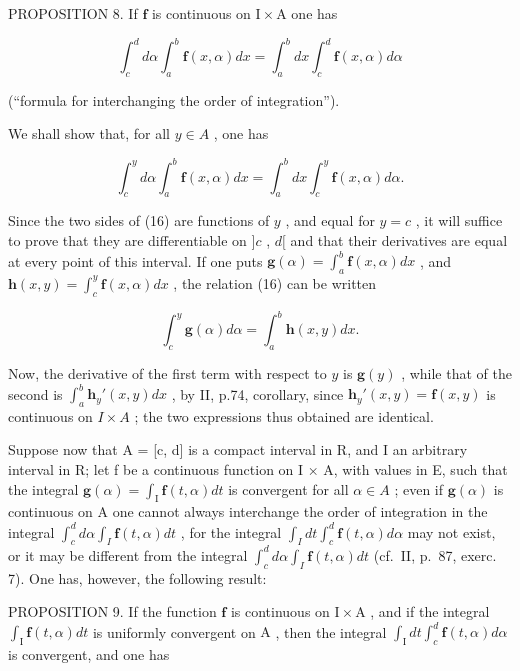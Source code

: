PROPOSITION 8. If \(\mathbf{f}\) is continuous on \(\mathrm{I} \times \mathrm{A}\) one has

\[
\int_ {c} ^ {d} d \alpha \int_ {a} ^ {b} \mathbf {f} (x, \alpha) d x = \int_ {a} ^ {b} d x \int_ {c} ^ {d} \mathbf {f} (x, \alpha) d \alpha\tag{15}
\]

(``formula for interchanging the order of integration'').

We shall show that, for all \(y \in A\) , one has

\[
\int_ {c} ^ {y} d \alpha \int_ {a} ^ {b} \mathbf {f} (x, \alpha) d x = \int_ {a} ^ {b} d x \int_ {c} ^ {y} \mathbf {f} (x, \alpha) d \alpha .\tag{16}
\]

Since the two sides of (16) are functions of \(y\) , and equal for \(y = c\) , it will suffice to prove that they are differentiable on \(]c\) , \(d[\) and that their derivatives are equal at every point of this interval. If one puts \(\mathbf{g}(\alpha) = \int_{a}^{b} \mathbf{f}(x, \alpha) dx\) , and \(\mathbf{h}(x, y) = \int_{c}^{y} \mathbf{f}(x, \alpha) dx\) , the relation (16) can be written

\[
\int_ {c} ^ {y} \mathbf {g} (\alpha) d \alpha = \int_ {a} ^ {b} \mathbf {h} (x, y) d x.
\]

Now, the derivative of the first term with respect to \(y\) is \(\mathbf{g}(y)\) , while that of the second is \(\int_{a}^{b} \mathbf{h}_{y}'(x, y) dx\) , by II, p.74, corollary, since \(\mathbf{h}_{y}'(x, y) = \mathbf{f}(x, y)\) is continuous on \(I \times A\) ; the two expressions thus obtained are identical.

Suppose now that A = {[}c, d{]} is a compact interval in R, and I an arbitrary interval in R; let f be a continuous function on I × A, with values in E, such that the integral \(\mathbf{g}(\alpha) = \int_{\mathrm{I}} \mathbf{f}(t, \alpha) dt\) is convergent for all \(\alpha \in A\) ; even if \(\mathbf{g}(\alpha)\) is continuous on A one cannot always interchange the order of integration in the integral \(\int_{c}^{d} d\alpha \int_{I} \mathbf{f}(t, \alpha) dt\) , for the integral \(\int_{I} dt \int_{c}^{d} \mathbf{f}(t, \alpha) d\alpha\) may not exist, or it may be different from the integral \(\int_{c}^{d} d\alpha \int_{I} \mathbf{f}(t, \alpha) dt\) (cf.~II, p.~87, exerc. 7). One has, however, the following result:

PROPOSITION 9. If the function \(\mathbf{f}\) is continuous on \(\mathrm{I} \times \mathrm{A}\) , and if the integral \(\int_{\mathrm{I}} \mathbf{f}(t, \alpha) dt\) is uniformly convergent on \(\mathrm{A}\) , then the integral \(\int_{\mathrm{I}} dt \int_{c}^{d} \mathbf{f}(t, \alpha) d\alpha\) is convergent, and one has

